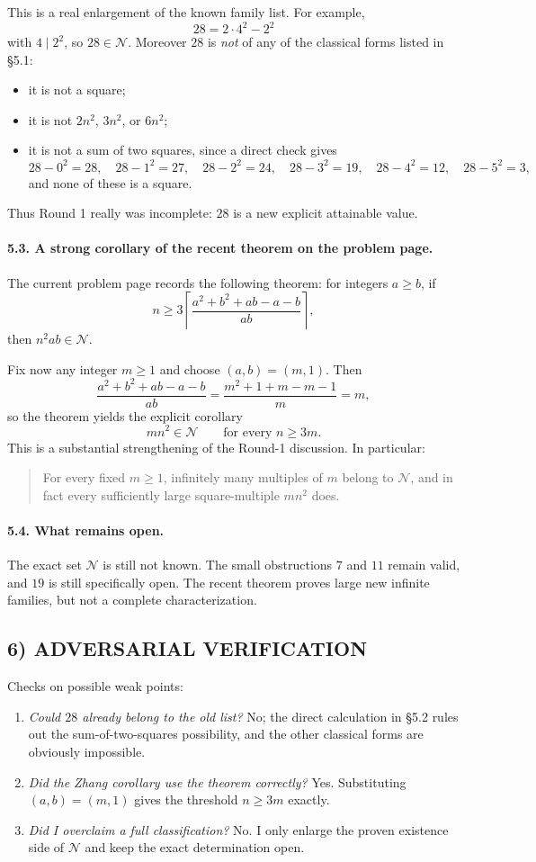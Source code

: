 This is a real enlargement of the known family list. For example,
\[
28=2\cdot 4^2-2^2
\]
with $4\mid 2^2$, so $28\in\mathcal N$.
Moreover $28$ is \emph{not} of any of the classical forms listed in \S5.1:
\begin{itemize}
\item it is not a square;
\item it is not $2n^2$, $3n^2$, or $6n^2$;
\item it is not a sum of two squares, since a direct check gives
\[
28-0^2=28,\quad 28-1^2=27,\quad 28-2^2=24,\quad 28-3^2=19,\quad 28-4^2=12,\quad 28-5^2=3,
\]
and none of these is a square.
\end{itemize}
Thus Round 1 really was incomplete: $28$ is a new explicit attainable value.

\paragraph{5.3. A strong corollary of the recent theorem on the problem page.}
The current problem page records the following theorem: for integers $a\ge b$, if
\[
n\ge 3\left\lceil \frac{a^2+b^2+ab-a-b}{ab}\right\rceil,
\]
then $n^2ab\in\mathcal N$.

Fix now any integer $m\ge 1$ and choose $(a,b)=(m,1)$. Then
\[
\frac{a^2+b^2+ab-a-b}{ab}
=
\frac{m^2+1+m-m-1}{m}=m,
\]
so the theorem yields the explicit corollary
\[
mn^2\in\mathcal N\qquad\text{for every } n\ge 3m.
\]
This is a substantial strengthening of the Round-1 discussion. In particular:
\begin{quote}
For every fixed $m\ge 1$, infinitely many multiples of $m$ belong to $\mathcal N$, and in fact every sufficiently large square-multiple $mn^2$ does.
\end{quote}

\paragraph{5.4. What remains open.}
The exact set $\mathcal N$ is still not known. The small obstructions $7$ and $11$ remain valid, and $19$ is still specifically open. The recent theorem proves large new infinite families, but not a complete characterization.

\subsection*{6) ADVERSARIAL VERIFICATION}
Checks on possible weak points:
\begin{enumerate}
\item \emph{Could $28$ already belong to the old list?} No; the direct calculation in \S5.2 rules out the sum-of-two-squares possibility, and the other classical forms are obviously impossible.
\item \emph{Did the Zhang corollary use the theorem correctly?} Yes. Substituting $(a,b)=(m,1)$ gives the threshold $n\ge 3m$ exactly.
\item \emph{Did I overclaim a full classification?} No. I only enlarge the proven existence side of $\mathcal N$ and keep the exact determination open.
\end{enumerate}

